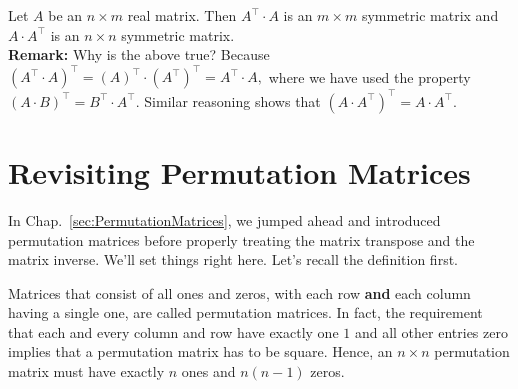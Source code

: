 \begin{tcolorbox}[sharp corners, colback=green!30, colframe=green!80!blue,title=\textbf{\large A Key Source of Symmetric Matrices}]
Let $A$ be an $n \times m$ real matrix. Then $A^\top \cdot A$ is an $m \times m$ symmetric matrix and $A \cdot A^\top$ is an $n \times n$ symmetric matrix. \\

\textbf{Remark:} Why is the above true? Because $\left(A^\top \cdot A\right)^\top =\left(A \right)^\top \cdot \left( A^\top\right)^\top = A^\top \cdot A,$ where we have used the property $\left( A \cdot B\right)^\top = B^\top \cdot A^\top.$ Similar reasoning shows that $\left(A \cdot A^\top \right)^\top =A \cdot A^\top . $
\end{tcolorbox}

\section{Revisiting Permutation Matrices} 
\label{sec:RevisitPermutation}
In Chap.~\ref{sec:PermutationMatrices}, we jumped ahead and introduced permutation matrices before properly treating the matrix transpose and the matrix inverse.  We'll set things right here. Let's recall the definition first.\\

\begin{tcolorbox}[title=\textbf{\large Permutation Matrices}]
Matrices that consist of all ones and zeros, with each row \textbf{and} each column having a single one, are called permutation matrices. In fact, the requirement that each and every column and row have exactly one $1$ and all other entries zero implies that a permutation matrix has to be square. Hence, an $n \times n$ permutation matrix must have exactly $n$ ones and $n(n-1)$ zeros. 
\end{tcolorbox}
\vspace*{0.1cm}



